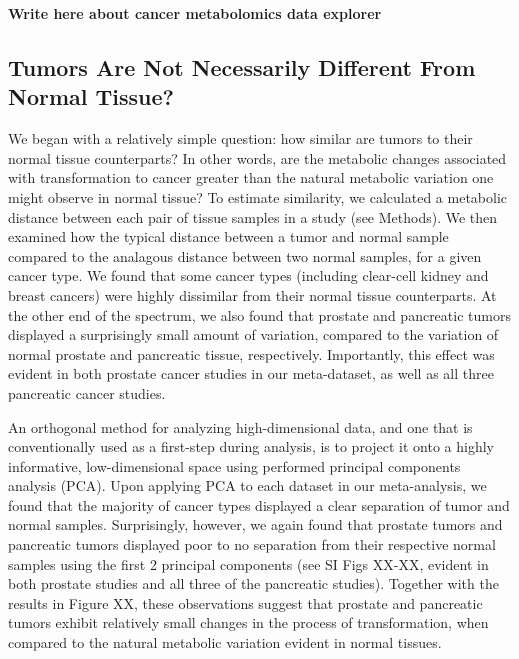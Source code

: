 \documentclass[10pt]{article}
\begin{document}
\textbf{Write here about cancer metabolomics data explorer}

\subsection{Tumors Are Not Necessarily Different From Normal Tissue?}

We began with a relatively simple question: how similar are tumors to their normal tissue counterparts? In other words, are the metabolic changes associated with transformation to cancer greater than the natural metabolic variation one might observe in normal tissue? To estimate similarity, we calculated a metabolic distance between each pair of tissue samples in a study (see Methods). We then examined how the typical distance between a tumor and normal sample compared to the analagous distance between two normal samples, for a given cancer type. We found that some cancer types (including clear-cell kidney and breast cancers) were highly dissimilar from their normal tissue counterparts. At the other end of the spectrum, we also found that prostate and pancreatic tumors displayed a surprisingly small amount of variation, compared to the variation of normal prostate and pancreatic tissue, respectively. Importantly, this effect was evident in both prostate cancer studies in our meta-dataset, as well as all three pancreatic cancer studies.

An orthogonal method for analyzing high-dimensional data, and one that is conventionally used as a first-step during analysis, is to project it onto a highly informative, low-dimensional space using performed principal components analysis (PCA).  Upon applying PCA to each dataset in our meta-analysis, we found that the majority of cancer types displayed a clear separation of tumor and normal samples. Surprisingly, however, we again found that prostate tumors and pancreatic tumors displayed poor to no separation from their respective normal samples using the first 2 principal components (see SI Figs XX-XX, evident in both prostate studies and all three of the pancreatic studies). Together with the results in Figure XX, these observations suggest that prostate and pancreatic tumors exhibit relatively small changes in the process of transformation, when compared to the natural metabolic variation evident in normal tissues.
\end{document}
